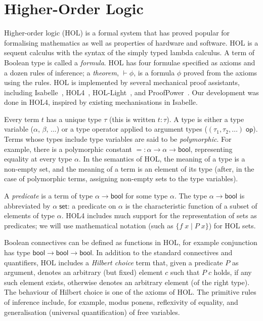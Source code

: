 \documentclass[twoside,titlepage,11pt]{article}
\begin{document}
\section{Higher-Order Logic}%
\newcommand{\bool}{\ensuremath{\mathsf{bool}}}
Higher-order logic (HOL) is a formal system that has proved popular for formalising mathematics as well as properties of hardware and software.
HOL is a sequent calculus with the syntax of the simply typed lambda calculus.
A term of Boolean type is called a \emph{formula}.
HOL has four formulae specified as axioms and a dozen rules of inference; a \emph{theorem}, $\vdash\phi$, is a formula $\phi$ proved from the axioms using the rules.
HOL is implemented by several mechanical proof assistants, including Isabelle~\cite{DBLP:conf/tphol/WenzelPN08}, HOL4~\cite{DBLP:conf/tphol/SlindN08}, HOL-Light~\cite{DBLP:conf/tphol/Harrison09a}, and ProofPower~\cite{ProofPower}.
Our development was done in HOL4, inspired by existing mechanisations \cite{Katovsky,DBLP:journals/entcs/OKeefe04} in Isabelle.

Every term $t$ has a unique type $\tau$ (this is written $t:\tau$).
A type is either a type variable ($\alpha$, $\beta$, ...) or a type operator applied to argument types ($(\tau_1,\tau_2,\dots)\;\mathsf{op}$).
Terms whose types include type variables are said to be \emph{polymorphic}.
For example, there is a polymorphic constant $\mathtt{=}:\alpha\to\alpha\to\bool$, representing equality at every type $\alpha$.
In the semantics of HOL, the meaning of a type is a non-empty set, and the meaning of a term is an element of its type (after, in the case of polymorphic terms, assigning non-empty sets to the type variables).

A \emph{predicate} is a term of type $\alpha\to\bool$ for some type $\alpha$.
The type $\alpha\to\bool$ is abbreviated by $\alpha\;\mathsf{set}$: a predicate on $\alpha$ is the characteristic function of a subset of elements of type $\alpha$.
HOL4 includes much support for the representation of sets as predicates; we will use mathematical notation (such as $\{f\;x\mid P\;x\}$) for HOL sets.

Boolean connectives can be defined as functions in HOL, for example conjunction has type $\bool\to\bool\to\bool$.
In addition to the standard connectives and quantifiers, HOL includes a \emph{Hilbert choice} term that, given a predicate $P$ as argument, denotes an arbitrary (but fixed) element $c$ such that $P\; c$ holds, if any such element exists, otherwise denotes an arbitrary element (of the right type).
The behaviour of Hilbert choice is one of the axioms of HOL.
The primitive rules of inference include, for example, modus ponens, reflexivity of equality, and generalisation (universal quantification) of free variables.
\end{document}
